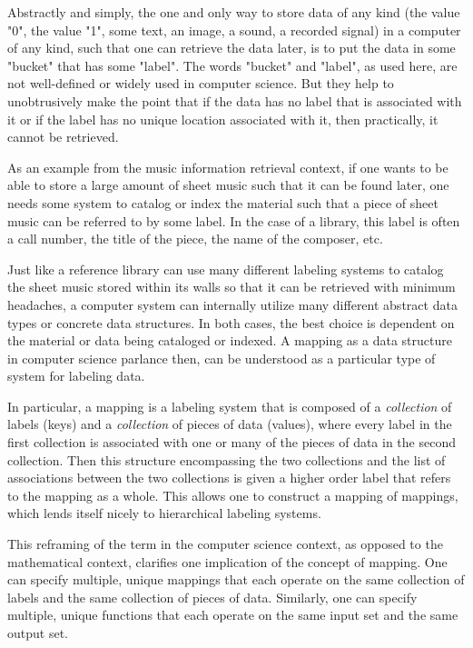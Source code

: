 Abstractly and simply, the one and only way to store data of any kind (the value "0", the value "1", some text, an image, a sound, a recorded signal) in a computer of any kind, such that one can retrieve the data later, is to put the data in some "bucket" that has some "label". The words "bucket" and "label", as used here, are not well-defined or widely used in computer science. But they help to unobtrusively make the point that if the data has no label that is associated with it or if the label has no unique location associated with it, then practically, it cannot be retrieved. 

As an example from the music information retrieval context, if one wants to be able to store a large amount of sheet music such that it can be found later, one needs some system to catalog or index the material such that a piece of sheet music can be referred to by some label. In the case of a library, this label is often a call number, the title of the piece, the name of the composer, etc.

Just like a reference library can use many different labeling systems to catalog the sheet music stored within its walls so that it can be retrieved with minimum headaches, a computer system can internally utilize many different abstract data types or concrete data structures. In both cases, the best choice is dependent on the material or data being cataloged or indexed. A mapping as a data structure in computer science parlance then, can be understood as a particular type of system for labeling data.

In particular, a mapping is a labeling system that is composed of a \emph{collection} of labels (keys) and a \emph{collection} of pieces of data (values), where every label in the first collection is associated with one or many of the pieces of data in the second collection. Then this structure encompassing the two collections and the list of associations between the two collections is given a higher order label that refers to the mapping as a whole. This allows one to construct a mapping of mappings, which lends itself nicely to hierarchical labeling systems.

This reframing of the term in the computer science context, as opposed to the mathematical context, clarifies one implication of the concept of mapping. One can specify multiple, unique mappings that each operate on the same collection of labels and the same collection of pieces of data. Similarly, one can specify multiple, unique functions that each operate on the same input set and the same output set. 

